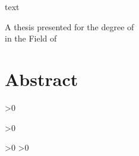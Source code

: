 \documentclass[
    paper=a4,
    fontsize=11pt,
    twoside=false,
    parskip=half,
    listof=totoc
]{scrbook}
\begin{document}
\begin{titlepage}
    \begin{center}
        \vspace*{1cm}

        \Huge
        \textbf{\thetitle}

        \vspace{0.5cm}
        \LARGE
        text

        \vspace{1.5cm}

        \textbf{\theauthor}

        \vfill

        \large
        A thesis presented for the degree of\\
        \textit{\thesisdegree}
        in the Field of \thesisfield

        \vspace{0.8cm}


        \vspace{0.8cm}

        \textbf{\thedate}

    \end{center}
\end{titlepage}
\frontmatter
\chapter*{Abstract}








%

\tableofcontents
\ifnum{}>0
  \listoffigures
\fi
\ifnum{}>0
  \listoftables
\fi
\ifnum{}>0
  \lstlistoflistings
\fi
\ifnum{}>0
  \listofalgorithms
\fi



\mainmatter








\end{document}
